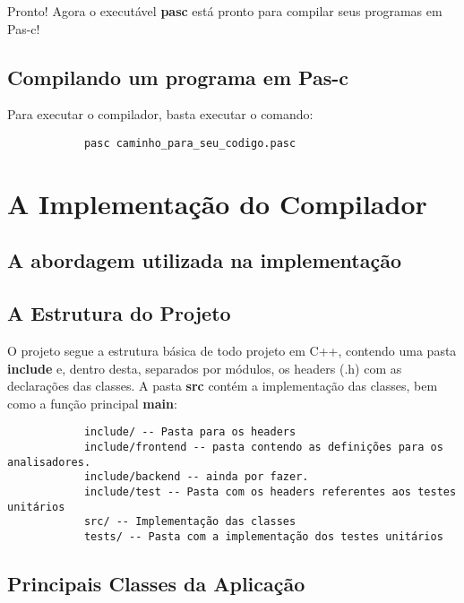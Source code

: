 \documentclass[11pt]{article}
\begin{document}
	Pronto! Agora o executável \textbf{pasc} está pronto para compilar seus programas em Pas-c!
	
	
	\subsection{Compilando um programa em Pas-c}
	
		Para executar o compilador, basta executar o comando:
		
		\begin{verbatim}
			pasc caminho_para_seu_codigo.pasc
		\end{verbatim}
	

\newpage
\section{A Implementação do Compilador}
	
	\subsection{A abordagem utilizada na implementação}
		
		
	\subsection{A Estrutura do Projeto}
		
		O projeto segue a estrutura básica de todo projeto em C++, contendo uma pasta \textbf{include} e, dentro desta, separados por módulos, os headers (.h) com as declarações das classes. A pasta \textbf{src} contém a implementação das classes, bem como a função principal \textbf{main}:
		
		\begin{verbatim}
			include/ -- Pasta para os headers
			include/frontend -- pasta contendo as definições para os analisadores.
			include/backend -- ainda por fazer.
			include/test -- Pasta com os headers referentes aos testes unitários
			src/ -- Implementação das classes
			tests/ -- Pasta com a implementação dos testes unitários 
		\end{verbatim}
		
		
		
	\subsection{Principais Classes da Aplicação}
		
\end{document}
